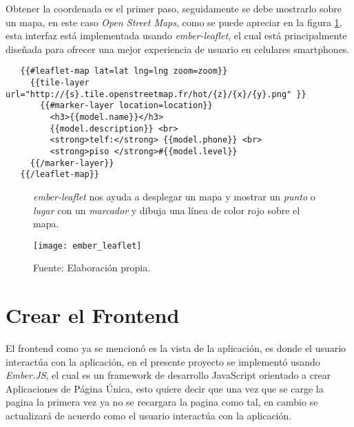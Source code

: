  Obtener la coordenada es el primer paso, seguidamente se debe mostrarlo sobre un mapa, en este caso \emph{Open Street Maps}, como se puede apreciar en la figura \ref{fig:ember_leaflet}, esta interfaz está implementada usando \emph{ember-leaflet}, el cual está principalmente dise\~nada para ofrecer una mejor experiencia de usuario en celulares smartphones.\\


 \begin{verbatim}
   {{#leaflet-map lat=lat lng=lng zoom=zoom}}
     {{tile-layer url="http://{s}.tile.openstreetmap.fr/hot/{z}/{x}/{y}.png" }}
       {{#marker-layer location=location}}
         <h3>{{model.name}}</h3>
         {{model.description}} <br>
         <strong>telf:</strong> {{model.phone}} <br>
         <strong>piso </strong>#{{model.level}}
     {{/marker-layer}}
   {{/leaflet-map}}
 \end{verbatim}

 \begin{figure}[H]
       \begin{center}
         \caption{\emph{ember-leaflet} nos ayuda a desplegar un mapa y mostrar un \emph{punto} o \emph{lugar} con un \emph{marcador} y dibuja una línea de color rojo sobre el mapa.}
         \label{fig:ember_leaflet}
         \texttt{[image: ember\_leaflet]}
       \end{center}
       \caption*{Fuente: Elaboración propia.}
 \end{figure}


\section{Crear el Frontend}
\label{sec:Crear el Frontend}


El frontend como ya se mencionó es la vista de la aplicación, es donde el usuario interactúa con la aplicación, en el presente proyecto se implementó usando \emph{Ember.JS}, el cual es un framework de desarrollo JavaScript orientado a crear Aplicaciones de Página Única, esto quiere decir que una vez que se carge la pagina la primera vez ya no se recargara la pagina como tal, en cambio se actualizará de acuerdo como el usuario interactúa con la aplicación.\\


